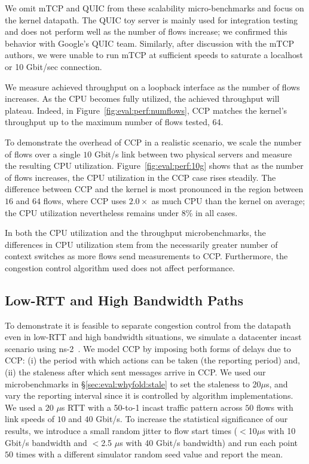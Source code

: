 We omit mTCP and QUIC from these scalability micro-benchmarks and focus on the kernel datapath. The QUIC toy server is mainly used for integration testing and does not perform well as the number of flows increase; we confirmed this behavior with Google's QUIC team. Similarly, after discussion with the mTCP authors, we were unable to run mTCP at sufficient speeds to saturate a localhost or 10 Gbit/sec connection.

 We measure achieved throughput on a loopback interface as the number of flows increases. As the CPU becomes fully utilized, the achieved throughput will plateau. Indeed, in Figure~\ref{fig:eval:perf:numflows}, CCP matches the kernel's throughput up to the maximum number of flows tested, 64. 

 To demonstrate the overhead of CCP in a realistic scenario, we scale the number of flows over a single $10$ Gbit/s link between two physical servers and measure the resulting CPU utilization.
Figure~\ref{fig:eval:perf:10g} shows that as the number of flows increases, the CPU utilization in the CCP case rises steadily. The difference between CCP and the kernel is most pronounced in the region between $16$ and $64$ flows, where CCP uses $2.0\times$ as much CPU than the kernel on average; the CPU utilization nevertheless remains under 8\% in all cases.

In both the CPU utilization and the throughput microbenchmarks, the differences in CPU utilization stem from the necessarily greater number of context switches as more flows send measurements to CCP. Furthermore, the congestion control algorithm used does not affect performance.

\subsection{Low-RTT and High Bandwidth Paths}
\label{sec:eval:lowrtt}

To demonstrate it is feasible to separate congestion control from the datapath even in low-RTT and high bandwidth situations, we simulate a datacenter incast scenario using ns-2~\cite{ns2}.
We model CCP by imposing both forms of delays due to CCP: (i) the period with which actions can be taken (the reporting period) and, (ii) the staleness after which sent messages arrive in CCP. We used our microbenchmarks in \S\ref{sec:eval:whyfold:stale} to set the staleness to 20$\mu$s, and vary the reporting interval since it is controlled by algorithm implementations. 
We used a $20$ $\mu$s RTT with a 50-to-1 incast traffic pattern across $50$ flows with link speeds of $10$ and $40$ Gbit/s. To increase the statistical significance of our results, we introduce a small random jitter to flow start times ($<$10$ \mu$s with 10 Gbit/s bandwidth and $<$2.5 $\mu$s with 40 Gbit/s bandwidth) and run each point $50$ times with a different simulator random seed value and report the mean.

